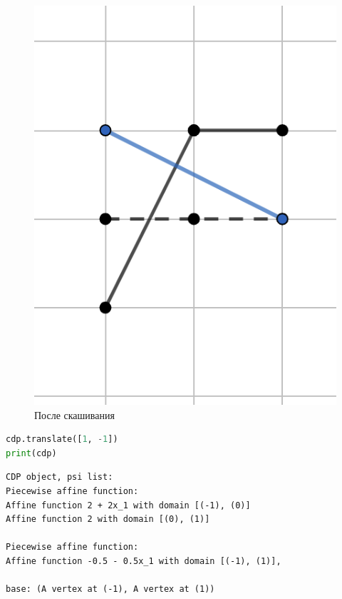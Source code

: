 \documentclass[fontsize=14pt]{scrartcl}
\theoremstyle{definition}
\begin{document}
\begin{figure}[!htb]
  \includegraphics[width=\linewidth]{shear.png}
  \caption{После скашивания}\label{fig:awesome_image2}
\endminipage\hfill
\end{figure}


\begin{lstlisting}[language=Python,style=python]
cdp.translate([1, -1])
print(cdp)
\end{lstlisting}

\begin{lstlisting}[style=output]
CDP object, psi list:
Piecewise affine function:
Affine function 2 + 2x_1 with domain [(-1), (0)]
Affine function 2 with domain [(0), (1)]

Piecewise affine function:
Affine function -0.5 - 0.5x_1 with domain [(-1), (1)],

base: (A vertex at (-1), A vertex at (1))
\end{lstlisting}
\end{document}
